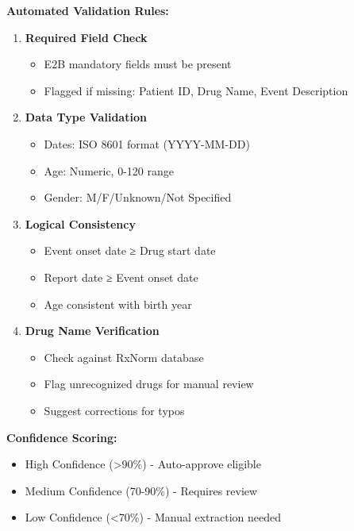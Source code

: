\textbf{Automated Validation Rules:}
\begin{enumerate}
    \item \textbf{Required Field Check}
    \begin{itemize}
        \item E2B mandatory fields must be present
        \item Flagged if missing: Patient ID, Drug Name, Event Description
    \end{itemize}
    
    \item \textbf{Data Type Validation}
    \begin{itemize}
        \item Dates: ISO 8601 format (YYYY-MM-DD)
        \item Age: Numeric, 0-120 range
        \item Gender: M/F/Unknown/Not Specified
    \end{itemize}
    
    \item \textbf{Logical Consistency}
    \begin{itemize}
        \item Event onset date ≥ Drug start date
        \item Report date ≥ Event onset date
        \item Age consistent with birth year
    \end{itemize}
    
    \item \textbf{Drug Name Verification}
    \begin{itemize}
        \item Check against RxNorm database
        \item Flag unrecognized drugs for manual review
        \item Suggest corrections for typos
    \end{itemize}
\end{enumerate}

\textbf{Confidence Scoring:}
\begin{itemize}
    \item \textcolor{successgreen}{High Confidence (>90\%)} - Auto-approve eligible
    \item \textcolor{warningyellow}{Medium Confidence (70-90\%)} - Requires review
    \item \textcolor{errorred}{Low Confidence (<70\%)} - Manual extraction needed
\end{itemize}


